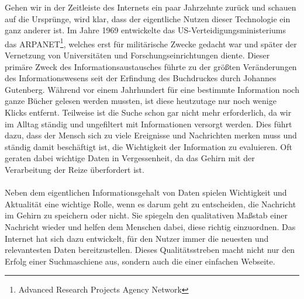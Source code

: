 Gehen wir in der Zeitleiste des Internets ein paar Jahrzehnte zurück und schauen auf die Ursprünge, wird klar, dass der eigentliche Nutzen dieser Technologie ein ganz anderer ist. Im Jahre 1969 entwickelte das US-Verteidigungsministeriums das ARPANET\footnote{Advanced Research Projects Agency Network}, welches erst für militärische Zwecke gedacht war und später der Vernetzung von Universitäten und Forschungseinrichtungen diente. Dieser primäre Zweck des Informationsaustausches führte zu der größten Veränderungen des Informationswesens seit der Erfindung des Buchdruckes durch Johannes Gutenberg. Während vor einem Jahrhundert für eine bestimmte Information noch ganze Bücher gelesen werden mussten, ist diese heutzutage nur noch wenige \glqq Klicks\grqq{} entfernt. Teilweise ist die Suche schon gar nicht mehr erforderlich, da wir im Alltag ständig und ungefiltert mit Informationen versorgt werden. Dies führt dazu, dass der Mensch sich zu viele Ereignisse und Nachrichten merken muss und ständig damit beschäftigt ist, die Wichtigkeit der Information zu evaluieren. Oft geraten dabei wichtige Daten in Vergessenheit, da das Gehirn mit der Verarbeitung der Reize überfordert ist.\\
\\
Neben dem eigentlichen Informationsgehalt von Daten spielen Wichtigkeit und Aktualität eine wichtige Rolle, wenn es darum geht zu entscheiden, die Nachricht im Gehirn zu speichern oder nicht. Sie spiegeln den qualitativen Maßstab einer Nachricht wieder und helfen dem Menschen dabei, diese richtig einzuordnen. Das Internet hat sich dazu entwickelt, für den Nutzer immer die neuesten und relevantesten Daten bereitzustellen. Dieses Qualitätsstreben macht nicht nur den Erfolg einer Suchmaschiene aus, sondern auch die einer einfachen Webseite.



